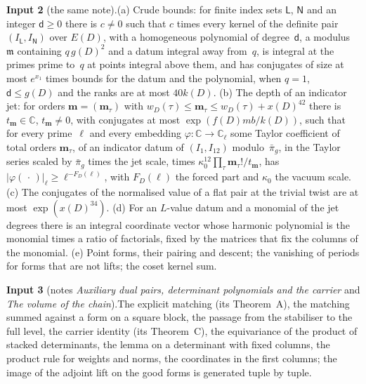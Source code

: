 \documentclass[11pt,a4paper]{article}
\newcommand{\m}[1]{\mbox{$#1$}}        %
\theoremstyle{plainx}
\theoremstyle{uprightx}
\newcommand{\CC}{\mathbb{C}}
\newcommand{\ix}[1]{\mathsf{#1}}
\newcommand{\tm}{t_{\mathbf{m}}}              %
\begin{document}
{\vspace{3pt}\textbf{Input 2} (the same note).\enspace (a) Crude bounds: for finite index sets \m{\ix L}, \m{\ix N} and
an integer \m{\mathsf{d}\ge0} there is \m{c\ne0} such that $c$ times every kernel of the definite pair
\m{(I_{\ix L},I_{\ix N})} over \m{E(D)}, with a homogeneous polynomial of degree~$\mathsf{d}$, a
modulus~$\mathfrak{m}$ containing
\m{q\,g(D)^2} and a datum integral away from~$q$, is integral at the primes prime to~$q$ at points integral above
them, and has conjugates of size at most \m{e^{x_1}} times bounds for the datum and the polynomial, when
\m{q=1}, \m{\mathsf{d}\le g(D)} and the ranks are at most \m{40k(D)}. (b) The depth of an indicator jet: for orders
\m{\mathbf{m}=(\mathbf{m}_\tau)} with \m{w_D(\tau)\le\mathbf{m}_\tau\le w_D(\tau)+x(D)^{42}} there is \m{\tm\in\CC},
\m{\tm\ne0}, with conjugates at most \m{\exp(f(D)mb/k(D))}, such that for every prime~$\ell$ and every embedding
\m{\varphi\colon\CC\to\CC_\ell} some Taylor coefficient of total orders \m{\mathbf{m}_\tau}, of an indicator datum of
\m{(I_1,I_{12})} modulo~\m{\bar\pi_g}, in the Taylor series scaled by \m{\bar\pi_g} times the jet scale, times
\m{\kappa_0^{12}\prod_\tau\mathbf{m}_\tau!/\tm}, has \m{|\varphi(\,\cdot\,)|_\ell\ge\ell^{-F_D(\ell)}}, with \m{F_D(\ell)} the
forced part and \m{\kappa_0} the vacuum scale. (c) The conjugates of the normalised value of a flat pair at the trivial twist are at
most \m{\exp(x(D)^{34})}. (d) For an $L$-value datum and a monomial of the jet degrees there is an integral
coordinate vector whose harmonic polynomial is the monomial times a ratio of factorials, fixed by the matrices
that fix the columns of the monomial. (e) Point forms, their pairing and descent; the vanishing of periods for
forms that are not lifts; the coset kernel sum.

\vspace{3pt}\textbf{Input 3} (notes \emph{Auxiliary dual pairs, determinant polynomials and the carrier} and
\emph{The volume of the chain}).\enspace The explicit matching (its Theorem~A), the matching summed against a form
on a square block, the passage from the stabiliser to the full level, the carrier identity (its Theorem~C), the
equivariance of the product of stacked determinants, the lemma on a determinant with fixed columns, the product
rule for weights and norms, the coordinates in the first columns; the image of the adjoint lift on the good forms
is generated tuple by tuple.}
\end{document}
